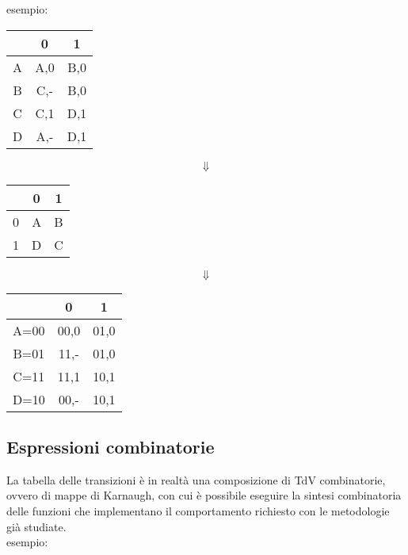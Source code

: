 \documentclass{subfiles}
\begin{document}
\noindent
esempio:

\begin{center}
\begin{tabular}{ |c|c|c| }
\hline
& 0 & 1 \\
\hline
\hline
A & A,0 & B,0 \\
B & C,- & B,0 \\
C & C,1 & D,1 \\
D & A,- & D,1 \\
\hline
\end{tabular}

$$\Downarrow$$

\begin{tabular}{ |c|c|c| }
\hline
& 0 & 1 \\
\hline
\hline
0 & A & B \\
1 & D & C \\
\hline
\end{tabular}

$$\Downarrow$$

\begin{tabular}{ |c|c|c| }
\hline
& 0 & 1 \\
\hline
\hline
A=00 & 00,0 & 01,0 \\
B=01 & 11,- & 01,0 \\
C=11 & 11,1 & 10,1 \\
D=10 & 00,- & 10,1 \\
\hline
\end{tabular}
\end{center}

\subsection{Espressioni combinatorie}

La tabella delle transizioni è in realtà una composizione di TdV combinatorie, ovvero di mappe di Karnaugh,
con cui è possibile eseguire la sintesi combinatoria delle funzioni che implementano il comportamento richiesto con le metodologie già studiate.\\

\noindent
esempio:
\end{document}
